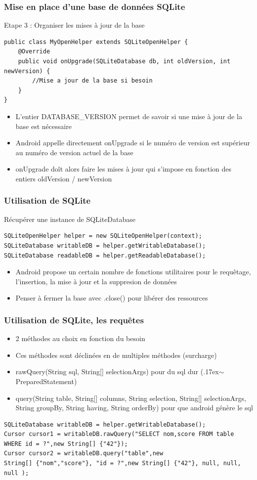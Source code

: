 \documentclass{beamer}
\begin{document}
\begin{frame}[fragile]
\frametitle{Mise en place d'une base de données SQLite}
Etape 3 : Organiser les mises à jour de la base
\begin{lstlisting}
public class MyOpenHelper extends SQLiteOpenHelper {
    @Override
    public void onUpgrade(SQLiteDatabase db, int oldVersion, int newVersion) {
        //Mise a jour de la base si besoin
    }
}
\end{lstlisting}
\begin{itemize}
    \item L'entier DATABASE\_VERSION permet de savoir si une mise à jour de la base est nécessaire
    \item Android appelle directement onUpgrade si le numéro de version est supérieur au numéro de version actuel de la base
    \item onUpgrade doît alors faire les mises à jour qui s'impose en fonction des entiers oldVersion / newVersion 
\end{itemize}
\end{frame}
\begin{frame}[fragile]
\frametitle{Utilisation de SQLite}
Récupérer une instance de SQLiteDatabase
\begin{lstlisting}
SQLiteOpenHelper helper = new SQLiteOpenHelper(context);
SQLiteDatabase writableDB = helper.getWritableDatabase();
SQLiteDatabase readableDB = helper.getReadableDatabase();
\end{lstlisting}
\begin{itemize}
    \item Android propose un certain nombre de fonctions utilitaires pour le requêtage, l'insertion, la mise à jour et la suppresion de données
    \item Penser à fermer la base avec .close() pour libérer des ressources
\end{itemize}
\end{frame}
\begin{frame}[fragile]
\frametitle{Utilisation de SQLite, les requêtes}
\begin{itemize}
    \item 2 méthodes au choix en fonction du besoin
    \item Ces méthodes sont déclinées en de multiples méthodes (surcharge)
    \item rawQuery(String sql, String[] selectionArgs) pour du sql dur ({\raise.17ex\hbox{$\scriptstyle\sim$}} PreparedStatement)
    \item query(String table, String[] columns, String selection, String[] selectionArgs, String groupBy, String having, String orderBy) pour que android génère le sql
\end{itemize}
\begin{lstlisting}
SQLiteDatabase writableDB = helper.getWritableDatabase();
Cursor cursor1 = writableDB.rawQuery("SELECT nom,score FROM table WHERE id = ?",new String[] {"42"});
Cursor cursor2 = writableDB.query("table",new String[] {"nom","score"}, "id = ?",new String[] {"42"}, null, null, null );
\end{lstlisting}
\end{frame}
\end{document}
